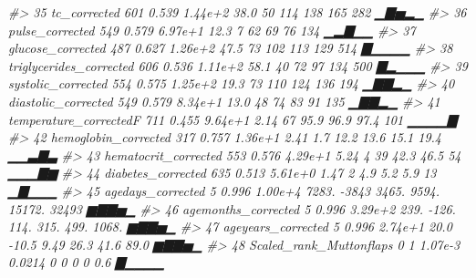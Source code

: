 \documentclass[]{article}
\newenvironment{Shaded}{\begin{snugshade}}{\end{snugshade}}
\newcommand{\CommentTok}[1]{\textcolor[rgb]{0.56,0.35,0.01}{\textit{#1}}}
\begin{document}
\begin{Shaded}
\begin{Highlighting}[]
\CommentTok{#> 35 tc_corrected                                                  601       0.539   1.44e+2     38.0           50         114         138         165         282    ▁▇▅▂▁}
\CommentTok{#> 36 pulse_corrected                                               549       0.579   6.97e+1     12.3            7          62          69          76         134    ▁▂▇▁▁}
\CommentTok{#> 37 glucose_corrected                                             487       0.627   1.26e+2     47.5           73         102         113         129         514    ▇▁▁▁▁}
\CommentTok{#> 38 triglycerides_corrected                                       606       0.536   1.11e+2     58.1           40          72          97         134         500    ▇▂▁▁▁}
\CommentTok{#> 39 systolic_corrected                                            554       0.575   1.25e+2     19.3           73         110         124         136         194    ▁▇▇▂▁}
\CommentTok{#> 40 diastolic_corrected                                           549       0.579   8.34e+1     13.0           48          74          83          91         135    ▁▇▇▂▁}
\CommentTok{#> 41 temperature_correctedF                                        711       0.455   9.64e+1      2.14          67          95.9        96.9        97.4       101    ▁▁▁▁▇}
\CommentTok{#> 42 hemoglobin_corrected                                          317       0.757   1.36e+1      2.41           1.7        12.2        13.6        15.1        19.4  ▁▁▃▇▃}
\CommentTok{#> 43 hematocrit_corrected                                          553       0.576   4.29e+1      5.24           4          39          42.3        46.5        54    ▁▁▁▇▆}
\CommentTok{#> 44 diabetes_corrected                                            635       0.513   5.61e+0      1.47           2           4.9         5.2         5.9        13    ▁▇▁▁▁}
\CommentTok{#> 45 agedays_corrected                                               5       0.996   1.00e+4   7283.         -3843        3465.       9594.      15172.      32493    ▆▇▇▅▁}
\CommentTok{#> 46 agemonths_corrected                                             5       0.996   3.29e+2    239.          -126.        114.        315.        499.       1068.   ▆▇▇▅▁}
\CommentTok{#> 47 ageyears_corrected                                              5       0.996   2.74e+1     20.0          -10.5         9.49       26.3        41.6        89.0  ▆▇▇▅▁}
\CommentTok{#> 48 Scaled_rank_Muttonflaps                                         0       1       1.07e-3      0.0214         0           0           0           0           0.6  ▇▁▁▁▁}

\end{Highlighting}
\end{Shaded}
\end{document}
